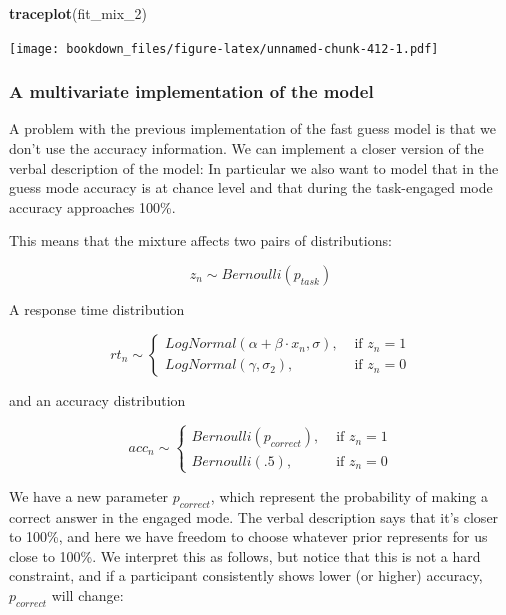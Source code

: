 \documentclass[12pt,]{krantz}
\newenvironment{Shaded}{\begin{snugshade}}{\end{snugshade}}
\newcommand{\KeywordTok}[1]{\textcolor[rgb]{0.13,0.29,0.53}{\textbf{#1}}}
\newcommand{\DecValTok}[1]{\textcolor[rgb]{0.00,0.00,0.81}{#1}}
\newcommand{\NormalTok}[1]{#1}
\theoremstyle{definition}
\theoremstyle{definition}
\theoremstyle{definition}
\theoremstyle{remark}
\begin{document}
\begin{Shaded}
\begin{Highlighting}[]
\KeywordTok{traceplot}\NormalTok{(fit_mix_}\DecValTok{2}\NormalTok{) }
\end{Highlighting}
\end{Shaded}

\texttt{[image: bookdown\_files/figure-latex/unnamed-chunk-412-1.pdf]}

\subsubsection{A multivariate implementation of the
model}\label{sec:multmix}

A problem with the previous implementation of the fast guess model is
that we don't use the accuracy information. We can implement a closer
version of the verbal description of the model: In particular we also
want to model that in the guess mode accuracy is at chance level and
that during the task-engaged mode accuracy approaches 100\%.

This means that the mixture affects two pairs of distributions:

\begin{equation}
z_n \sim Bernoulli(p_{task})
\end{equation}

A response time distribution

\begin{equation}
rt_n \sim 
\begin{cases}
LogNormal(\alpha + \beta \cdot x_n, \sigma), & \text{ if } z_n =1 \\
LogNormal(\gamma, \sigma_2), & \text{ if } z_n=0
\end{cases}
\label{eq:dismix2}
\end{equation}

and an accuracy distribution

\begin{equation}
acc_n \sim 
\begin{cases}
Bernoulli(p_{correct}), & \text{ if } z_n =1 \\
Bernoulli(.5), & \text{ if } z_n=0
\end{cases}
\label{eq:dismix3}
\end{equation}

We have a new parameter \(p_{correct}\), which represent the probability
of making a correct answer in the engaged mode. The verbal description
says that it's closer to 100\%, and here we have freedom to choose
whatever prior represents for us close to 100\%. We interpret this as
follows, but notice that this is not a hard constraint, and if a
participant consistently shows lower (or higher) accuracy,
\(p_{correct}\) will change:
\end{document}
